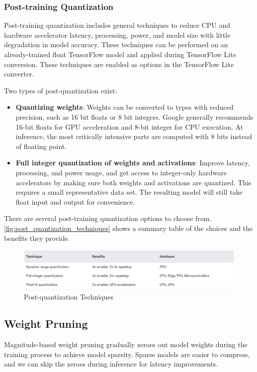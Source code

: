 \subsubsection{Post-training Quantization}
Post-training quantization includes general techniques to reduce CPU and
hardware accelerator latency, processing, power, and model size with little
degradation in model accuracy. These techniques can be performed on an
already-trained float TensorFlow model and applied during TensorFlow Lite
conversion. These techniques are enabled as options in the TensorFlow Lite
converter.

Two types of post-quantization exist:
\begin{itemize}
    \item \textbf{Quantizing weights}: Weights can be converted to types with
        reduced precision, such as 16 bit floats or 8 bit integers. Google
        generally recommends 16-bit floats for GPU acceleration and 8-bit
        integer for CPU execution. At inference, the most critically intensive
        parts are computed with 8 bits instead of floating point.
    \item \textbf{Full integer quantization of weights and activations}:
        Improve latency, processing, and power usage, and get access to
        integer-only hardware accelerators by making sure both weights and
        activations are quantized.  This requires a small representative data
        set. The resulting model will still take float input and output for
        convenience.
\end{itemize}

There are several post-training quantization options to choose from.
\autoref{fig:post_quantization_techniques} shows a summary table of the choices
and the benefits they provide.~\cite{tfmot:quantization_post_training}

\begin{figure}[ht]
    \includegraphics[width=\textwidth]{images/introduction/post_quantization_techniques.png}
    \centering
    \caption{Post-quantization Techniques}\label{fig:post_quantization_techniques}
\end{figure}

\subsection{Weight Pruning}
Magnitude-based weight pruning gradually zeroes out model weights during the
training process to achieve model sparsity. Sparse models are easier to
compress, and we can skip the zeroes during inference for latency improvements.


